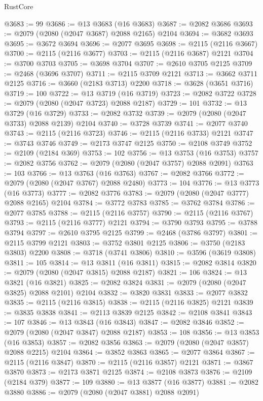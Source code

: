 \begin{lexlean}{RustCore}
\begin{coremodule}
@3683 := 99
@3686 := @13 @3683 (@16 @3683)
@3687 := @2082 @3686
@3693 := @2079 (@2080 (@2047 @3687) @2088 @2165) @2104
@3694 := @3682 @3693
@3695 := @3672 @3694
@3696 := @2077 @3695
@3698 := @2115 (@2116 @3667)
@3700 := @2115 (@2116 @3677)
@3703 := @2115 (@2116 @3687) @2121
@3704 := @3700 @3703
@3705 := @3698 @3704
@3707 := @2610 @3705 @2125
@3709 := @2468 (@3696 @3707)
@3711 := @2115 @3709 @2121
@3713 := @3662 @3711 @2125
@3716 := @3660 (@2183 @3713) @2200
@3718 := @3628 (@3651 @3716)
@3719 := 100
@3722 := @13 @3719 (@16 @3719)
@3723 := @2082 @3722
@3728 := @2079 (@2080 (@2047 @3723) @2088 @2187)
@3729 := 101
@3732 := @13 @3729 (@16 @3729)
@3733 := @2082 @3732
@3739 := @2079 (@2080 (@2047 @3733) @2088 @2139) @2104
@3740 := @3728 @3739
@3741 := @2077 @3740
@3743 := @2115 (@2116 @3723)
@3746 := @2115 (@2116 @3733) @2121
@3747 := @3743 @3746
@3749 := @2173 @3747 @2125
@3750 := @2108 @3749
@3752 := @2109 (@2184 @369)
@3753 := 102
@3756 := @13 @3753 (@16 @3753)
@3757 := @2082 @3756
@3762 := @2079 (@2080 (@2047 @3757) @2088 @2091)
@3763 := 103
@3766 := @13 @3763 (@16 @3763)
@3767 := @2082 @3766
@3772 := @2079 (@2080 (@2047 @3767) @2088 @2480)
@3773 := 104
@3776 := @13 @3773 (@16 @3773)
@3777 := @2082 @3776
@3783 := @2079 (@2080 (@2047 @3777) @2088 @2165) @2104
@3784 := @3772 @3783
@3785 := @3762 @3784
@3786 := @2077 @3785
@3788 := @2115 (@2116 @3757)
@3790 := @2115 (@2116 @3767)
@3793 := @2115 (@2116 @3777) @2121
@3794 := @3790 @3793
@3795 := @3788 @3794
@3797 := @2610 @3795 @2125
@3799 := @2468 (@3786 @3797)
@3801 := @2115 @3799 @2121
@3803 := @3752 @3801 @2125
@3806 := @3750 (@2183 @3803) @2200
@3808 := @3718 (@3741 @3806)
@3810 := @3596 (@3619 @3808)
@3811 := 105
@3814 := @13 @3811 (@16 @3811)
@3815 := @2082 @3814
@3820 := @2079 (@2080 (@2047 @3815) @2088 @2187)
@3821 := 106
@3824 := @13 @3821 (@16 @3821)
@3825 := @2082 @3824
@3831 := @2079 (@2080 (@2047 @3825) @2088 @2101) @2104
@3832 := @3820 @3831
@3833 := @2077 @3832
@3835 := @2115 (@2116 @3815)
@3838 := @2115 (@2116 @3825) @2121
@3839 := @3835 @3838
@3841 := @2113 @3839 @2125
@3842 := @2108 @3841
@3843 := 107
@3846 := @13 @3843 (@16 @3843)
@3847 := @2082 @3846
@3852 := @2079 (@2080 (@2047 @3847) @2088 @2187)
@3853 := 108
@3856 := @13 @3853 (@16 @3853)
@3857 := @2082 @3856
@3863 := @2079 (@2080 (@2047 @3857) @2088 @2215) @2104
@3864 := @3852 @3863
@3865 := @2077 @3864
@3867 := @2115 (@2116 @3847)
@3870 := @2115 (@2116 @3857) @2121
@3871 := @3867 @3870
@3873 := @2173 @3871 @2125
@3874 := @2108 @3873
@3876 := @2109 (@2184 @379)
@3877 := 109
@3880 := @13 @3877 (@16 @3877)
@3881 := @2082 @3880
@3886 := @2079 (@2080 (@2047 @3881) @2088 @2091)

\end{coremodule}
\end{lexlean}
